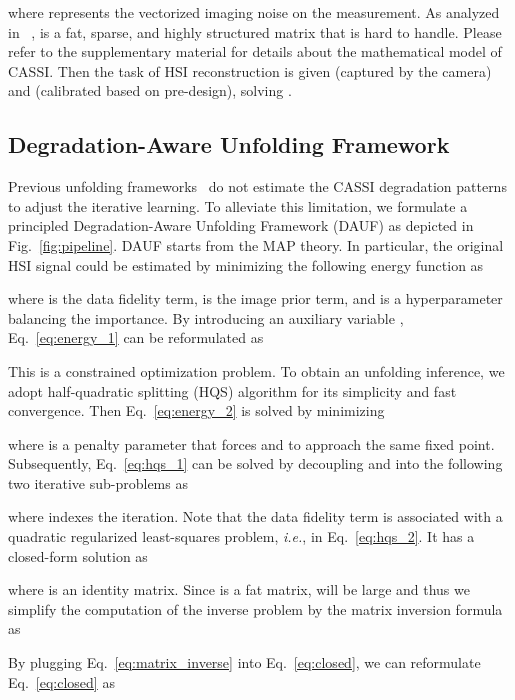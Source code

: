\documentclass{article}
\begin{document}
where  represents the vectorized imaging noise on the measurement. As analyzed in ~\cite{Tropp07ITT,Donoho06ITT,jalali2019snapshot},  is a fat, sparse, and highly structured matrix that is hard to handle. Please refer to the supplementary material for details about the mathematical model of CASSI.  Then the  task of HSI reconstruction is given  (captured by the  camera) and  (calibrated based on pre-design), solving .

\vspace{-1mm}
\subsection{Degradation-Aware Unfolding Framework} \label{sec:dauf}
\vspace{-1mm}
Previous unfolding frameworks~\cite{dnu,hssp,gapnet,admm-net} do not estimate the CASSI degradation patterns to adjust the iterative learning.  To alleviate this limitation, we formulate a principled Degradation-Aware Unfolding Framework (DAUF) as depicted in Fig.~\ref{fig:pipeline}. DAUF starts from the MAP theory. In particular, the original HSI signal could be estimated by minimizing the following energy function as

where  is the data  fidelity term,  is the image prior term, and  is a hyperparameter balancing the importance. By introducing an auxiliary variable , Eq.~\eqref{eq:energy_1} can be reformulated as 

This is a constrained optimization problem. To obtain an unfolding inference, we adopt half-quadratic splitting (HQS) algorithm for its simplicity and fast convergence. Then Eq.~\eqref{eq:energy_2} is solved by minimizing 

where  is a penalty parameter that forces  and  to approach the same fixed point. Subsequently, Eq.~\eqref{eq:hqs_1} can be solved by decoupling  and   into the following two iterative sub-problems as

where  indexes the iteration. Note that the data fidelity term  is associated with a quadratic regularized least-squares problem, \emph{i.e.},  in Eq.~\eqref{eq:hqs_2}. It has a closed-form solution as 

where  is an identity matrix. Since  is a fat matrix,  will be large and thus we simplify the computation of the inverse problem  by the matrix inversion formula as  

By plugging Eq.~\eqref{eq:matrix_inverse} into Eq.~\eqref{eq:closed}, we can reformulate Eq.~\eqref{eq:closed} as 
\end{document}
